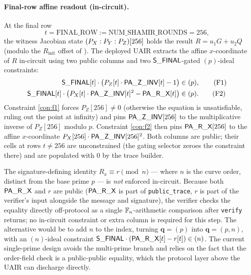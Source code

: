 \paragraph{Final-row affine readout (in-circuit).}
At the final row $$t = \mathrm{FINAL\_ROW} := \mathrm{NUM\_SHAMIR\_ROUNDS} = 256,$$
the witness Jacobian state $(P_X : P_Y : P_Z)[256]$ holds the result
$R = u_1 G + u_2 Q$ (modulo the $R_{\mathrm{init}}$ offset of
). The deployed UAIR extracts the affine
$x$-coordinate of $R$ in-circuit using two public columns and two
$\mathsf{S\_FINAL}$-gated $(p)$-ideal constraints:
\begin{align}
\mathsf{S\_FINAL}[t] \cdot \bigl(P_Z[t] \cdot \mathsf{PA\_Z\_INV}[t] - 1\bigr) &\in (p), \tag{F1}\label{con:f1}\\
\mathsf{S\_FINAL}[t] \cdot \bigl(P_X[t] \cdot \mathsf{PA\_Z\_INV}[t]^2 - \mathsf{PA\_R\_X}[t]\bigr) &\in (p). \tag{F2}\label{con:f2}
\end{align}
Constraint \ref{con:f1} forces $P_Z[256] \neq 0$ (otherwise the equation
is unsatisfiable, ruling out the point at infinity) and pins
$\mathsf{PA\_Z\_INV}[256]$ to the multiplicative inverse of $P_Z[256]$
modulo $p$. Constraint \ref{con:f2} then pins $\mathsf{PA\_R\_X}[256]$
to the affine $x$-coordinate $P_X[256] \cdot \mathsf{PA\_Z\_INV}[256]^2$.
Both columns are public; their cells at rows $t \neq 256$ are
unconstrained (the gating selector zeroes the constraint there) and
are populated with $0$ by the trace builder.

\begin{remark}\label{rem:final-readout}
The signature-defining identity $R_x \equiv r \pmod n$ — where $n$ is
the curve order, distinct from the base prime $p$ — is \emph{not}
enforced in-circuit. Because both $\mathsf{PA\_R\_X}$ and $r$ are
public ($\mathsf{PA\_R\_X}$ is part of \texttt{public\_trace}, $r$ is
part of the verifier's input alongside the message and signature),
the verifier checks the equality directly off-protocol as a single
$\mathbb{F}_n$-arithmetic comparison after \texttt{verify} returns; no
in-circuit constraint or extra column is required for this step.
The alternative would be to add $n$ to the index, turning
$\mathbf{q} = (p)$ into $\mathbf{q} = (p, n)$, with an $(n)$-ideal
constraint $\mathsf{S\_FINAL} \cdot (\mathsf{PA\_R\_X}[t] - r[t]) \in (n)$.
The current single-prime design avoids the multi-prime branch and
relies on the fact that the order-field check is a public-public
equality, which the protocol layer above the UAIR can discharge
directly.
\end{remark}
